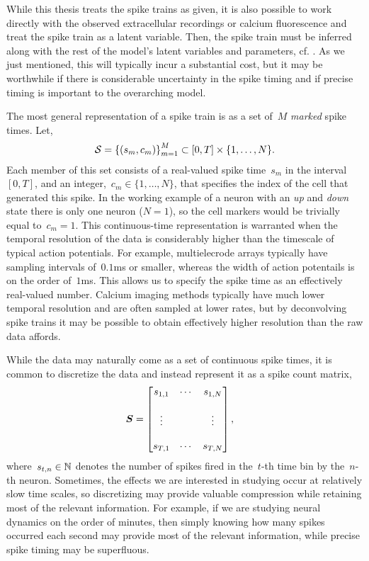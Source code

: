While this thesis treats the spike trains as given, it is also possible to
work directly with the observed extracellular recordings or calcium
fluorescence and treat the spike train as a latent variable.  Then,
the spike train must be inferred along with the rest of the model's
latent variables and parameters, cf. \cite{pillow2013model}. As we just 
mentioned, this will typically incur a substantial cost, but it may be 
worthwhile if there is considerable uncertainty in the spike timing 
and if precise timing is important to the overarching model.

The most general representation of a spike train is as a set of~$M$
\emph{marked} spike times.
Let,
\begin{align}
  \mathcal{S} = \left \{ (s_m, c_m) \right \}_{m=1}^M \subset [0, T] \times \{1, \ldots, N\}.
\end{align}
Each member of this set consists of a real-valued spike time~$s_m$ in
the interval~$[0, T]$, and an integer,~$c_m \in \{1, \ldots, N\}$,
that specifies the index of the cell that generated this spike. In the
working example of a neuron with an \emph{up} and \emph{down} state
there is only one neuron ($N=1$), so the cell markers would be
trivially equal to~$c_m=1$. This continuous-time representation is
warranted when the temporal resolution of the data is considerably
higher than the timescale of typical action potentials. For example,
multielecrode arrays typically have sampling intervals of~$0.1$ms or
smaller, whereas the width of action potentails is on the order
of~$1$ms. This allows us to specify the spike time as an effectively
real-valued number.  Calcium imaging methods typically have much lower
temporal resolution and are often sampled at lower rates, but by
deconvolving spike trains it may be possible to obtain effectively
higher resolution than the raw data affords.

While the data may naturally come as a set of continuous spike times, it is common 
to discretize the data and instead represent it as a spike count matrix,
\begin{align}
  \boldsymbol{S} &= 
        \begin{bmatrix}
          s_{1,1} & \cdots & s_{1,N} \\
          & & \\
          \vdots  &        & \vdots  \\ 
          & & \\
          s_{T,1} & \cdots & s_{T,N}
        \end{bmatrix},
\end{align}
where~$s_{t,n} \in \mathbb{N}$ denotes the number of spikes fired in
the~$t$-th time bin by the~$n$-th neuron. Sometimes, the effects we
are interested in studying occur at relatively slow time scales, so
discretizing may provide valuable compression while retaining most of
the relevant information. For example, if we are studying neural
dynamics on the order of minutes, then simply knowing how many spikes
occurred each second may provide most of the relevant information, while
precise spike timing may be superfluous.

